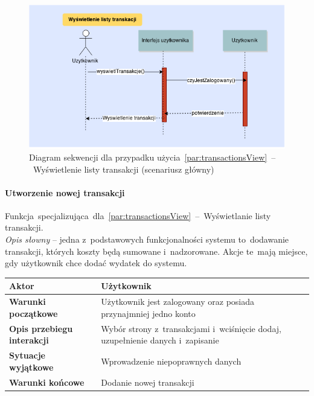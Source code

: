 \begin{figure}[H]
  \includegraphics[width=\textwidth]{images/wyswietl_transakcje.png}
  \caption{Diagram sekwencji dla przypadku użycia~\ref{par:transactionsView}~--~Wyświetlenie listy transakcji (scenariusz główny)}
\end{figure}

\paragraph{Utworzenie nowej transakcji\newline}
\label{par:transactionCreate}
Funkcja~specjalizująca~dla~\ref{par:transactionsView}~--~Wyświetlanie listy transakcji.\\

\textit{Opis słowny} -- jedna z~podstawowych funkcjonalności systemu to~dodawanie transakcji, których koszty będą sumowane i~nadzorowane. Akcje te~mają miejsce, gdy użytkownik chce dodać wydatek do systemu.

\begin{longtable}{|p{5cm}|p{7cm}|}
  \hline \textbf{Aktor} & Użytkownik \\
  \hline \textbf{Warunki początkowe} & Użytkownik jest zalogowany oraz posiada przynajmniej jedno konto \\
  \hline \textbf{Opis przebiegu interakcji} & Wybór strony z~transakcjami i~wciśnięcie dodaj, uzupełnienie danych i~zapisanie \\
  \hline \textbf{Sytuacje wyjątkowe} & Wprowadzenie niepoprawnych danych \\
  \hline \textbf{Warunki końcowe} & Dodanie nowej transakcji \\
  \hline
\end{longtable}

